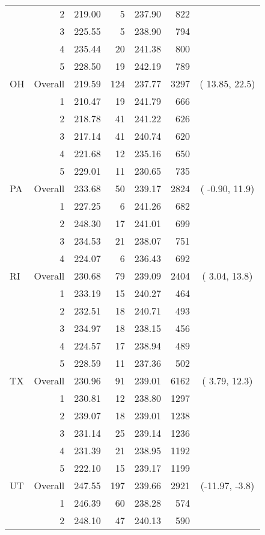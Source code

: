 \begin{longtable}{lrrr@{\extracolsep{.25cm}}rrc}
   & 2 & 219.00 &   5 & 237.90 & 822 &  \\ 
   & 3 & 225.55 &   5 & 238.90 & 794 &  \\ 
   & 4 & 235.44 &  20 & 241.38 & 800 &  \\ 
   & 5 & 228.50 &  19 & 242.19 & 789 &  \\ 
   \hline
OH & Overall & 219.59 & 124 & 237.77 & 3297 & ( 13.85, 22.5) \\ 
   & 1 & 210.47 &  19 & 241.79 & 666 &  \\ 
   & 2 & 218.78 &  41 & 241.22 & 626 &  \\ 
   & 3 & 217.14 &  41 & 240.74 & 620 &  \\ 
   & 4 & 221.68 &  12 & 235.16 & 650 &  \\ 
   & 5 & 229.01 &  11 & 230.65 & 735 &  \\ 
   \hline
PA & Overall & 233.68 &  50 & 239.17 & 2824 & ( -0.90, 11.9) \\ 
   & 1 & 227.25 &   6 & 241.26 & 682 &  \\ 
   & 2 & 248.30 &  17 & 241.01 & 699 &  \\ 
   & 3 & 234.53 &  21 & 238.07 & 751 &  \\ 
   & 4 & 224.07 &   6 & 236.43 & 692 &  \\ 
   \hline
RI & Overall & 230.68 &  79 & 239.09 & 2404 & (  3.04, 13.8) \\ 
   & 1 & 233.19 &  15 & 240.27 & 464 &  \\ 
   & 2 & 232.51 &  18 & 240.71 & 493 &  \\ 
   & 3 & 234.97 &  18 & 238.15 & 456 &  \\ 
   & 4 & 224.57 &  17 & 238.94 & 489 &  \\ 
   & 5 & 228.59 &  11 & 237.36 & 502 &  \\ 
   \hline
TX & Overall & 230.96 &  91 & 239.01 & 6162 & (  3.79, 12.3) \\ 
   & 1 & 230.81 &  12 & 238.80 & 1297 &  \\ 
   & 2 & 239.07 &  18 & 239.01 & 1238 &  \\ 
   & 3 & 231.14 &  25 & 239.14 & 1236 &  \\ 
   & 4 & 231.39 &  21 & 238.95 & 1192 &  \\ 
   & 5 & 222.10 &  15 & 239.17 & 1199 &  \\ 
   \hline
UT & Overall & 247.55 & 197 & 239.66 & 2921 & (-11.97, -3.8) \\ 
   & 1 & 246.39 &  60 & 238.28 & 574 &  \\ 
   & 2 & 248.10 &  47 & 240.13 & 590 &  \\ 

\end{longtable}
